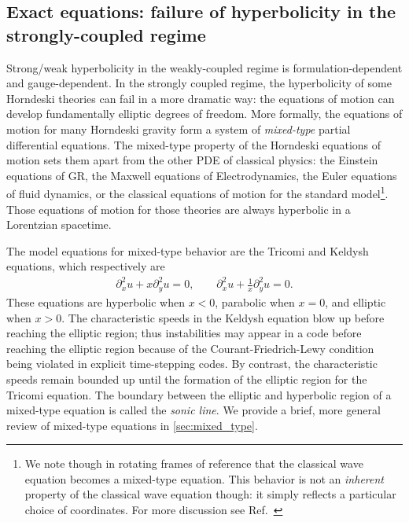 \documentclass{ws-ijmpd}
\begin{document}
\subsection{Exact equations:
failure of hyperbolicity in the strongly-coupled regime
\label{sec:failure_strong_hyperbolicity}
}
Strong/weak hyperbolicity in the weakly-coupled regime is 
formulation-dependent and gauge-dependent.
In the strongly coupled regime, 
the hyperbolicity of some Horndeski theories can fail in a more
dramatic way: the equations of motion can develop fundamentally
elliptic degrees of freedom.
More formally, the equations of motion for many Horndeski gravity
form a system of \emph{mixed-type} 
partial differential equations.
The mixed-type property of the Horndeski equations of motion sets
them apart from the other PDE of classical physics: the
Einstein equations of GR, the Maxwell equations of
Electrodynamics, the Euler equations of fluid dynamics,
or the classical equations of motion for
the standard model\footnote{We note though in rotating frames of reference
that the classical wave equation becomes a mixed-type equation.
This behavior is not an \emph{inherent} property of the classical wave
equation though: it simply reflects a particular choice of coordinates.
For more discussion see Ref.~}.
Those equations of motion for those
theories are always hyperbolic in a Lorentzian spacetime.

The model equations for mixed-type behavior are the 
Tricomi and Keldysh equations\cite{https://doi.org/10.1002/cpa.3160230404,chen2015tricomi}, 
which respectively are
\begin{align}
   \partial_x^2u
   +
   x
   \partial_y^2u
   =
   0
   ,\qquad
   \partial_x^2u
   +
   \frac{1}{x}
   \partial_y^2u
   =
   0
   .
\end{align}
These equations are hyperbolic when $x<0$, parabolic when $x=0$,
and elliptic when $x>0$.
The characteristic speeds in the Keldysh equation
blow up before reaching the elliptic region; thus instabilities may appear 
in a code before reaching the elliptic region because of the 
Courant-Friedrich-Lewy condition being violated in explicit time-stepping codes.
By contrast, the characteristic speeds remain bounded
up until the formation of the elliptic region for the Tricomi equation.
The boundary between the elliptic and hyperbolic region of a mixed-type
equation is called the \emph{sonic line}\cite{rassias1990lecture,otway2015elliptic}.
We provide a brief, more general review of mixed-type equations in 
\ref{sec:mixed_type}.
\end{document}
